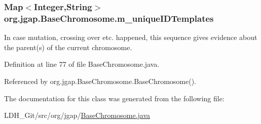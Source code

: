 \hypertarget{classorg_1_1jgap_1_1_base_chromosome_ae74c4eae0fc849d8210ec100bbb01042}{
\subsubsection[{m\-\_\-unique\-I\-D\-Templates}]{\setlength{\rightskip}{0pt plus 5cm}Map$<$Integer,String$>$ org.\-jgap.\-Base\-Chromosome.\-m\-\_\-unique\-I\-D\-Templates\hspace{0.3cm}{\ttfamily [private]}}}\label{classorg_1_1jgap_1_1_base_chromosome_ae74c4eae0fc849d8210ec100bbb01042}
In case mutation, crossing over etc. happened, this sequence gives evidence about the parent(s) of the current chromosome. 

Definition at line 77 of file Base\-Chromosome.\-java.



Referenced by org.\-jgap.\-Base\-Chromosome.\-Base\-Chromosome().



The documentation for this class was generated from the following file\-:\begin{DoxyCompactItemize}
\item 
L\-D\-H\-\_\-\-Git/src/org/jgap/\hyperlink{_base_chromosome_8java}{Base\-Chromosome.\-java}\end{DoxyCompactItemize}
